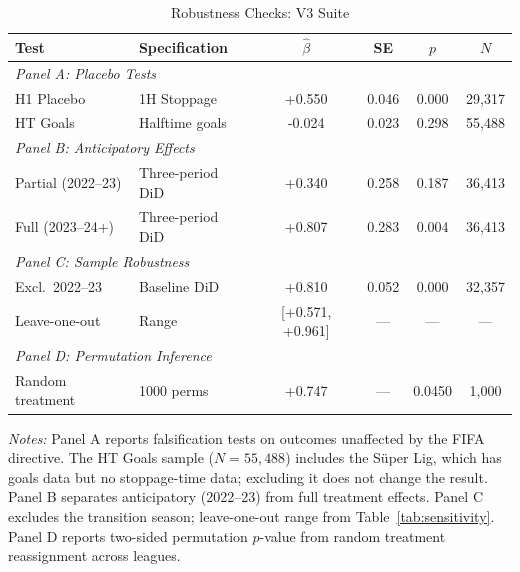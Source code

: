\begin{table}[htbp]
\centering
\caption{Robustness Checks: V3 Suite}
\label{tab:robustness_v3}
\begin{threeparttable}
\begin{tabular}{llcccc}
\toprule
Test & Specification & $\hat{\beta}$ & SE & $p$ & $N$ \\
\midrule
\multicolumn{6}{l}{\textit{Panel A: Placebo Tests}} \\
  H1 Placebo & 1H Stoppage & +0.550 & 0.046 & 0.000 & 29,317 \\
  HT Goals & Halftime goals & -0.024 & 0.023 & 0.298 & 55,488 \\
\midrule
\multicolumn{6}{l}{\textit{Panel B: Anticipatory Effects}} \\
  Partial (2022--23) & Three-period DiD & +0.340 & 0.258 & 0.187 & 36,413 \\
  Full (2023--24+) & Three-period DiD & +0.807 & 0.283 & 0.004 & 36,413 \\
\midrule
\multicolumn{6}{l}{\textit{Panel C: Sample Robustness}} \\
  Excl.\ 2022--23 & Baseline DiD & +0.810 & 0.052 & 0.000 & 32,357 \\
  Leave-one-out & Range & [+0.571, +0.961] & --- & --- & --- \\
\midrule
\multicolumn{6}{l}{\textit{Panel D: Permutation Inference}} \\
  Random treatment & 1000 perms & +0.747 & --- & 0.0450 & 1,000 \\
\bottomrule
\end{tabular}
\begin{tablenotes}[flushleft]\footnotesize
\item \textit{Notes:} Panel A reports falsification tests on outcomes unaffected by the FIFA directive. The HT Goals sample ($N = 55{,}488$) includes the S\"{u}per Lig, which has goals data but no stoppage-time data; excluding it does not change the result. Panel B separates anticipatory (2022--23) from full treatment effects. Panel C excludes the transition season; leave-one-out range from Table~\ref{tab:sensitivity}. Panel D reports two-sided permutation $p$-value from random treatment reassignment across leagues.
\end{tablenotes}
\end{threeparttable}
\end{table}
